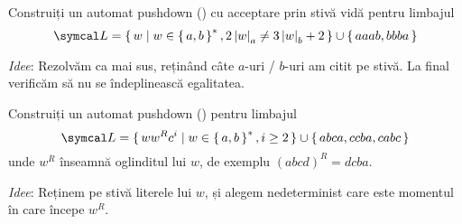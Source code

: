 \begin{exercise}
    Construiți un automat pushdown (\pda{}) cu acceptare prin stivă vidă pentru limbajul
    \[
        \lang = \set{ w | w \in \set{a, b}^*, 2 \abs{w}_a \neq 3 \abs{w}_b + 2 } \cup \set{ aaab, bbba }
    \]
\end{exercise}

\textit{Idee}: Rezolvăm ca mai sus, reținând câte \(a\)-uri / \(b\)-uri am citit pe stivă. La final verificăm să nu se îndeplinească egalitatea.

\begin{exercise}
    Construiți un automat pushdown (\pda{}) pentru limbajul
    \[
        \lang = \set{ w w^R c^i | w \in \set{a, b}^*, i \geq 2 } \cup \set{ abca, ccba, cabc }
    \]
    unde \(w^R\) înseamnă oglinditul lui \(w\), de exemplu \((abcd)^R = dcba\).
\end{exercise}

\textit{Idee}: Reținem pe stivă literele lui \(w\), și alegem nedeterminist care este momentul în care începe \(w^R\).


